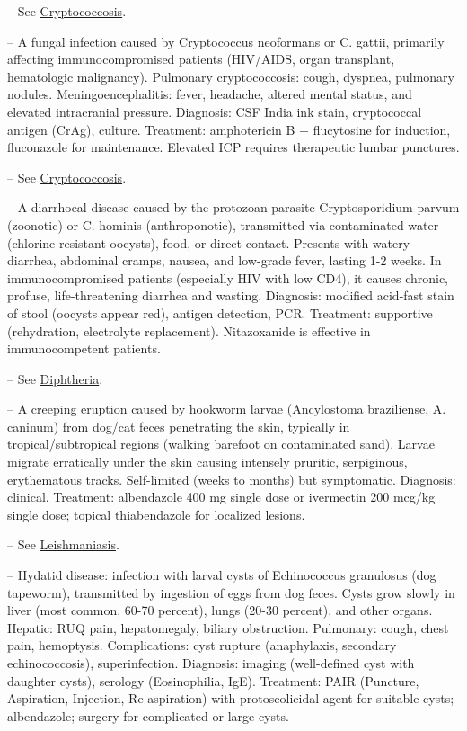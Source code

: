 -- See \hyperlink{Cryptococcosis}{Cryptococcosis}.

-- A fungal infection caused by Cryptococcus neoformans or C. gattii, primarily affecting immunocompromised patients (HIV/AIDS, organ transplant, hematologic malignancy). Pulmonary cryptococcosis: cough, dyspnea, pulmonary nodules. Meningoencephalitis: fever, headache, altered mental status, and elevated intracranial pressure. Diagnosis: CSF India ink stain, cryptococcal antigen (CrAg), culture. Treatment: amphotericin B + flucytosine for induction, fluconazole for maintenance. Elevated ICP requires therapeutic lumbar punctures.

-- See \hyperlink{Cryptococcosis}{Cryptococcosis}.

-- A diarrhoeal disease caused by the protozoan parasite Cryptosporidium parvum (zoonotic) or C. hominis (anthroponotic), transmitted via contaminated water (chlorine-resistant oocysts), food, or direct contact. Presents with watery diarrhea, abdominal cramps, nausea, and low-grade fever, lasting 1-2 weeks. In immunocompromised patients (especially HIV with low CD4), it causes chronic, profuse, life-threatening diarrhea and wasting. Diagnosis: modified acid-fast stain of stool (oocysts appear red), antigen detection, PCR. Treatment: supportive (rehydration, electrolyte replacement). Nitazoxanide is effective in immunocompetent patients.

-- See \hyperlink{Diphtheria}{Diphtheria}.

-- A creeping eruption caused by hookworm larvae (Ancylostoma braziliense, A. caninum) from dog/cat feces penetrating the skin, typically in tropical/subtropical regions (walking barefoot on contaminated sand). Larvae migrate erratically under the skin causing intensely pruritic, serpiginous, erythematous tracks. Self-limited (weeks to months) but symptomatic. Diagnosis: clinical. Treatment: albendazole 400 mg single dose or ivermectin 200 mcg/kg single dose; topical thiabendazole for localized lesions.

-- See \hyperlink{Leishmaniasis}{Leishmaniasis}.

-- Hydatid disease: infection with larval cysts of Echinococcus granulosus (dog tapeworm), transmitted by ingestion of eggs from dog feces. Cysts grow slowly in liver (most common, 60-70 percent), lungs (20-30 percent), and other organs. Hepatic: RUQ pain, hepatomegaly, biliary obstruction. Pulmonary: cough, chest pain, hemoptysis. Complications: cyst rupture (anaphylaxis, secondary echinococcosis), superinfection. Diagnosis: imaging (well-defined cyst with daughter cysts), serology (Eosinophilia, IgE). Treatment: PAIR (Puncture, Aspiration, Injection, Re-aspiration) with protoscolicidal agent for suitable cysts; albendazole; surgery for complicated or large cysts.

